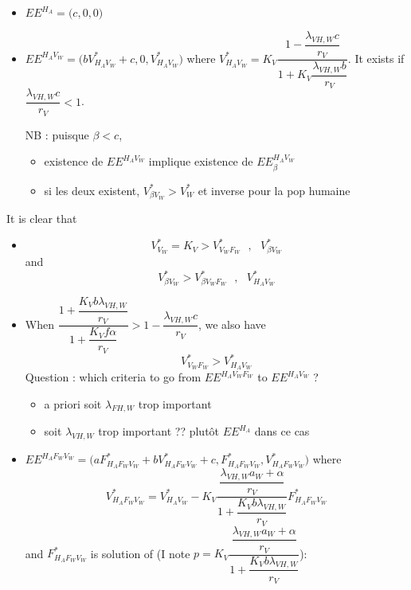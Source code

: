 \documentclass{article}
\newcommand{\lfw}{\lambda_{FH, W}}
\newcommand{\lvw}{\lambda_{VH, W}}
\begin{document}
\begin{itemize}
\item $EE^{H_A} = \Big(c, 0, 0\Big)$
\item $EE^{H_AV_W} = \Big(bV^*_{H_AV_W} + c, 0, V^*_{H_AV_W}\Big)$ where $V^*_{H_AV_W} = K_V \dfrac{1-\dfrac{\lvw c}{r_V}}{1 + K_V \dfrac{\lvw b}{r_V}}$. It exists if $\dfrac{\lvw c}{r_V} < 1$.

NB : puisque $\beta < c$, 
\begin{itemize}
\item existence de $EE^{H_AV_W}$ implique existence de $EE^{H_AV_W}_\beta$
\item si les deux existent, $V^*_{\beta V_W} > V_W^*$ et inverse pour la pop humaine
\end{itemize}
\end{itemize}

It is clear that
\begin{itemize}
\item
\begin{equation}
V^*_{V_W} = K_V > V^*_{V_WF_W}\:\:\: , \:\:\:V^*_{\beta V_W}
\end{equation}
and 
\begin{equation}
V^*_{\beta V_W} > V^*_{\beta V_W F_W} \:\:\: , \:\:\: V^*_{H_A V_W}
\end{equation}
\item When $\dfrac{1 + \dfrac{K_V b \lvw}{r_V}}{1 + \dfrac{K_V f \alpha}{r_V}} > 1 - \dfrac{\lvw c }{r_V}$, we also have
\begin{equation}
V^*_{V_WF_W} > V^*_{H_A V_W}
\end{equation}
Question : which criteria to go from $EE^{H_AV_WF_W}$ to $EE^{H_AV_W}$ ?
\begin{itemize}
\item a priori soit $\lfw$ trop important
\item soit $\lvw$ trop important ?? plutôt $EE^{H_A}$ dans ce cas
\end{itemize}

\item $EE^{H_AF_WV_W} = \Big(a F^*_{H_AF_WV_W} + bV^*_{H_AF_WV_W} + c, F^*_{H_AF_WV_W}, V^*_{H_AF_WV_W}\Big)$ where
\begin{equation}
V^*_{H_AF_WV_W} = V^*_{H_AV_W} - K_V \dfrac{\dfrac{\lvw a_W + \alpha}{r_V}}{1 + \dfrac{K_V b \lvw}{r_V}} F^*_{H_AF_WV_W}
\end{equation}
and $F^*_{H_AF_WV_W}$ is solution of (I note $p = K_V \dfrac{\dfrac{\lvw a_W + \alpha}{r_V}}{1 + \dfrac{K_V b \lvw}{r_V}}$):


\end{itemize}
\end{document}
